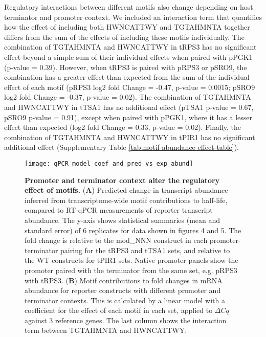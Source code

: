 \documentclass[../main.tex]{subfiles}
\begin{document}
Regulatory interactions between different motifs also change depending on host terminator and promoter context.
We included an interaction term that quantifies how the effect of including both HWNCATTWY and TGTAHMNTA together differs from the sum of the effects of including these motifs individually.
The combination of TGTAHMNTA and HWNCATTWY in tRPS3 has no significant effect beyond a simple sum of their individual effects when paired with pPGK1 (p-value = 0.39).
However, when tRPS3 is paired with pRPS3 or pSRO9, the combination has a greater effect than expected from the sum of the individual effect of each motif (pRPS3 log2 fold Change = -0.47, p-value = 0.0015; pSRO9 log2 fold Change = -0.37, p-value = 0.02).
The combination of TGTAHMNTA and HWNCATTWY in tTSA1 has no additional effect (pTSA1 p-value = 0.67, pSRO9 p-value = 0.91), except when paired with pPGK1, where it has a lesser effect than expected (log2 fold Change = 0.33, p-value = 0.02).
Finally, the combination of TGTAHMNTA and HWNCATTWY in tPIR1 has no significant additional effect (Supplementary Table \ref{tab:motif-abundance-effect-table}).

\begin{figure}[p]

{\centering \texttt{[image: qPCR\_model\_coef\_and\_pred\_vs\_exp\_abund]} 

}

\caption[Promoter and terminator context alter the regulatory effect of motifs.]{\textbf{Promoter and terminator context alter the regulatory effect of motifs.} (\textbf{A}) Predicted change in transcript abundance inferred from transcriptome-wide motif contributions to half-life, compared to RT-qPCR measurements of reporter transcript abundance. The y-axis shows statistical summaries (mean and standard error) of 6 replicates for data shown in figures 4 and 5. The fold change is relative to the mod\_NNN construct in each promoter-terminator pairing for the tRPS3 and tTSA1 sets, and relative to the WT constructs for tPIR1 sets. Native promoter panels show the promoter paired with the terminator from the same set, e.g. pRPS3 with tRPS3. (\textbf{B}) Motif contributions to fold changes in mRNA abundance for reporter constructs with different promoter and terminator contexts. This is calculated by a linear model with a coefficient for the effect of each motif in each set, applied to $\Delta Cq$ against 3 reference genes. The last column shows the interaction term between TGTAHMNTA and HWNCATTWY.}\label{fig:hlife-predict-vs-abundance-and-motif-context-dependence}
\end{figure}
\end{document}
